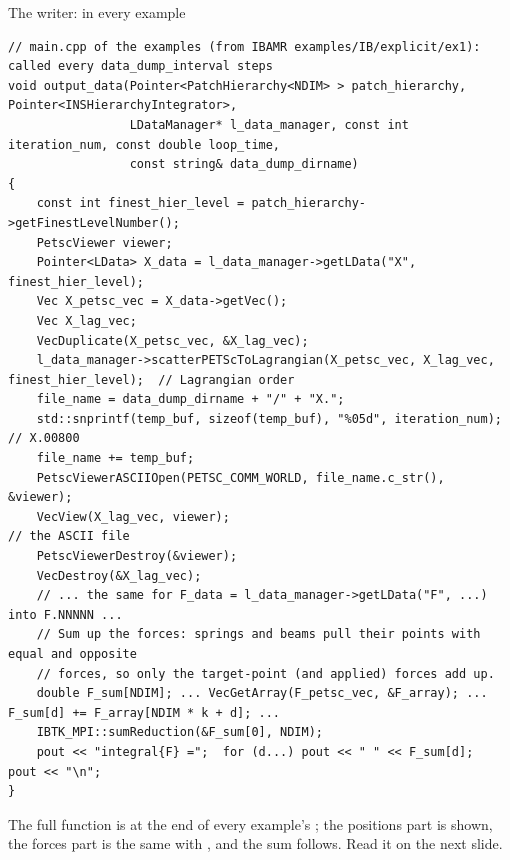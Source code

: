 \documentclass[aspectratio=169,11pt]{beamer}
\begin{document}
\begin{frame}[fragile]{The writer:  in every example}
\label{fr:writer}
\begin{lstlisting}[style=cpptiny]
// main.cpp of the examples (from IBAMR examples/IB/explicit/ex1): called every data_dump_interval steps
void output_data(Pointer<PatchHierarchy<NDIM> > patch_hierarchy, Pointer<INSHierarchyIntegrator>,
                 LDataManager* l_data_manager, const int iteration_num, const double loop_time,
                 const string& data_dump_dirname)
{
    const int finest_hier_level = patch_hierarchy->getFinestLevelNumber();
    PetscViewer viewer;
    Pointer<LData> X_data = l_data_manager->getLData("X", finest_hier_level);
    Vec X_petsc_vec = X_data->getVec();
    Vec X_lag_vec;
    VecDuplicate(X_petsc_vec, &X_lag_vec);
    l_data_manager->scatterPETScToLagrangian(X_petsc_vec, X_lag_vec, finest_hier_level);  // Lagrangian order
    file_name = data_dump_dirname + "/" + "X.";
    std::snprintf(temp_buf, sizeof(temp_buf), "%05d", iteration_num);                   // X.00800
    file_name += temp_buf;
    PetscViewerASCIIOpen(PETSC_COMM_WORLD, file_name.c_str(), &viewer);
    VecView(X_lag_vec, viewer);                                                          // the ASCII file
    PetscViewerDestroy(&viewer);
    VecDestroy(&X_lag_vec);
    // ... the same for F_data = l_data_manager->getLData("F", ...) into F.NNNNN ...
    // Sum up the forces: springs and beams pull their points with equal and opposite
    // forces, so only the target-point (and applied) forces add up.
    double F_sum[NDIM]; ... VecGetArray(F_petsc_vec, &F_array); ... F_sum[d] += F_array[NDIM * k + d]; ...
    IBTK_MPI::sumReduction(&F_sum[0], NDIM);
    pout << "integral{F} =";  for (d...) pout << " " << F_sum[d];  pout << "\n";
}
\end{lstlisting}
\footnotesize The full function is at the end of every example's ; the positions part is shown, the forces part is the same with , and the sum follows. Read it on the next slide.
\end{frame}
\end{document}
